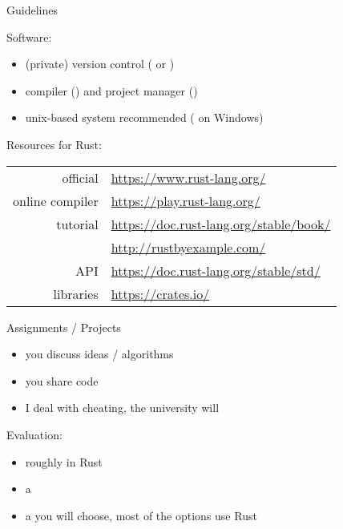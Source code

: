 \documentclass[10pt]{beamer}
\begin{document}
\begin{frame}{Guidelines}

Software:
\medskip
\begin{itemize}
  \item (private) version control ( or )
  \item {} compiler () and project manager ()
  \item unix-based system recommended ( on Windows)
\end{itemize}
\bigskip

\pause

Resources for Rust:\\
\medskip
\begin{tabular}{r l}
  official & \url{https://www.rust-lang.org/} \\
  online compiler & \url{https://play.rust-lang.org/} \\
  tutorial & \url{https://doc.rust-lang.org/stable/book/} \\
  & \url{http://rustbyexample.com/} \\
  API & \url{https://doc.rust-lang.org/stable/std/} \\
  libraries & \url{https://crates.io/} \\
\end{tabular}

\end{frame}





\begin{frame}{Assignments / Projects}

\begin{itemize}
  \bigsep
  \item you  discuss ideas / algorithms
  \item you  share code
  \item I  deal with cheating, the university will
\end{itemize}
\bigskip

\pause

Evaluation:

\begin{itemize}
  \item roughly  in Rust
  \item a 
  \item a  you will choose,
    most of the options use Rust
\end{itemize}

\end{frame}
\end{document}
